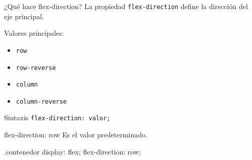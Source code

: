 \documentclass[aspectratio=169,11.5pt]{beamer}
\begin{document}
    \begin{frame}{¿Qué hace flex-direction?}
        La propiedad \texttt{flex-direction}
        define la dirección del eje principal.

        Valores principales:

        \begin{itemize}
            \item \texttt{row}
            \item \texttt{row-reverse}
            \item \texttt{column}
            \item \texttt{column-reverse}
        \end{itemize}

        \begin{block}{Sintaxis}
            \texttt{flex-direction: valor;}
        \end{block}
    \end{frame}

    \begin{frame}[fragile]{flex-direction: row}
        Es el valor predeterminado.

        \begin{csscodedark}
            .contenedor {
                display: flex;
                flex-direction: row;
            }
        \end{csscodedark}

        \begin{center}
        \end{center}
    \end{frame}
\end{document}
